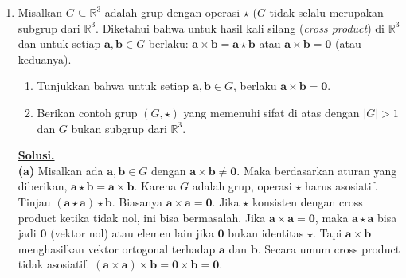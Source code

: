 \documentclass[12pt,twoside]{article}
\newenvironment{solution}
{
	\par\noindent\textbf{\underline{Solusi.}}\\
}
{
	\par
}
\begin{document}
\begin{enumerate}
\begin{solution}
          Diketahui $(g'(1)-f(1))(f(0)-g'(0)) > 0$.
          Substitusi $h$: $h(1)(-h(0)) > 0 \iff -h(1)h(0) > 0 \iff h(0)h(1) < 0$.
          Artinya $h(0)$ dan $h(1)$ berbeda tanda.
          Karena $K(x)$ terdiferensialkan di $(0,1)$ (sebab $g$ terdiferensialkan dan $f$ kontinu), turunannya $h(x) = K'(x)$ memenuhi Sifat Nilai Antara (Teorema Darboux), meskipun $h(x)$ sendiri belum tentu kontinu.
          Teorema Darboux menyatakan bahwa jika fungsi terdiferensialkan pada interval, maka turunannya memiliki sifat nilai antara.
          Karena $h(0)$ dan $h(1)$ berbeda tanda, maka haruslah terdapat $c$ di antara 0 dan 1 sedemikian sehingga $h(c) = 0$.
          Jadi $g'(c) - f(c) = 0$.
        \end{solution}
  \item Misalkan $G\subseteq \mathbb{R}^3$ adalah grup dengan operasi $\star$ ($G$ tidak selalu merupakan subgrup dari $\mathbb{R}^3$. Diketahui bahwa untuk hasil kali silang (\textit{cross product}) di $\mathbb{R}^3$ dan untuk setiap $\mathbf{a,b}\in G$ berlaku: $\mathbf{a}\times \mathbf{b}=\mathbf{a}\star \mathbf{b}$ atau $\mathbf{a}\times \mathbf{b} = \mathbf{0}$ (atau keduanya).
        \begin{enumerate}
          \item Tunjukkan bahwa untuk setiap $\mathbf{a,b}\in G$, berlaku $\mathbf{a}\times\mathbf{b}=\mathbf{0}$.
          \item Berikan contoh grup $(G,\star)$ yang memenuhi sifat di atas dengan $|G|>1$ dan $G$ bukan subgrup dari $\mathbb{R}^3$.
        \end{enumerate}
        \begin{solution}
          \textbf{(a)}
          Misalkan ada $\mathbf{a}, \mathbf{b} \in G$ dengan $\mathbf{a} \times \mathbf{b} \neq \mathbf{0}$.
          Maka berdasarkan aturan yang diberikan, $\mathbf{a} \star \mathbf{b} = \mathbf{a} \times \mathbf{b}$.
          Karena $G$ adalah grup, operasi $\star$ harus asosiatif.
          Tinjau $(\mathbf{a} \star \mathbf{a}) \star \mathbf{b}$.
          Biasanya $\mathbf{a} \times \mathbf{a} = \mathbf{0}$. Jika $\star$ konsisten dengan cross product ketika tidak nol, ini bisa bermasalah.
          Jika $\mathbf{a} \times \mathbf{a} = \mathbf{0}$, maka $\mathbf{a} \star \mathbf{a}$ bisa jadi $\mathbf{0}$ (vektor nol) atau elemen lain jika $\mathbf{0}$ bukan identitas $\star$. Tapi $\mathbf{a} \times \mathbf{b}$ menghasilkan vektor ortogonal terhadap $\mathbf{a}$ dan $\mathbf{b}$.
          Secara umum cross product tidak asosiatif.
          $(\mathbf{a} \times \mathbf{a}) \times \mathbf{b} = \mathbf{0} \times \mathbf{b} = \mathbf{0}$.

\end{solution}
\end{enumerate}
\end{document}
